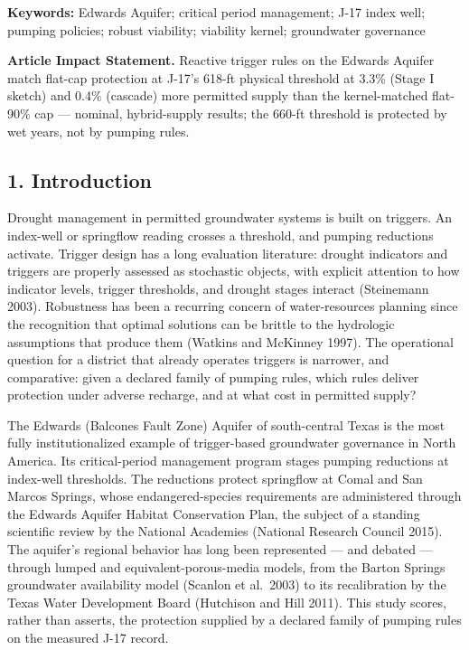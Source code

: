 \documentclass[11pt]{article}
\begin{document}
\textbf{Keywords:} Edwards Aquifer; critical period management; J-17
index well; pumping policies; robust viability; viability kernel;
groundwater governance

\textbf{Article Impact Statement.} Reactive trigger rules on the Edwards
Aquifer match flat-cap protection at J-17's 618-ft physical threshold at
3.3\% (Stage I sketch) and 0.4\% (cascade) more permitted supply than
the kernel-matched flat-90\% cap --- nominal, hybrid-supply results; the
660-ft threshold is protected by wet years, not by pumping rules.

\subsection{1. Introduction}\label{introduction}

Drought management in permitted groundwater systems is built on
triggers. An index-well or springflow reading crosses a threshold, and
pumping reductions activate. Trigger design has a long evaluation
literature: drought indicators and triggers are properly assessed as
stochastic objects, with explicit attention to how indicator levels,
trigger thresholds, and drought stages interact (Steinemann 2003).
Robustness has been a recurring concern of water-resources planning
since the recognition that optimal solutions can be brittle to the
hydrologic assumptions that produce them (Watkins and McKinney 1997).
The operational question for a district that already operates triggers
is narrower, and comparative: given a declared family of pumping rules,
which rules deliver protection under adverse recharge, and at what cost
in permitted supply?

The Edwards (Balcones Fault Zone) Aquifer of south-central Texas is the
most fully institutionalized example of trigger-based groundwater
governance in North America. Its critical-period management program
stages pumping reductions at index-well thresholds. The reductions
protect springflow at Comal and San Marcos Springs, whose
endangered-species requirements are administered through the Edwards
Aquifer Habitat Conservation Plan, the subject of a standing scientific
review by the National Academies (National Research Council 2015). The
aquifer's regional behavior has long been represented --- and debated
--- through lumped and equivalent-porous-media models, from the Barton
Springs groundwater availability model (Scanlon et al.~2003) to its
recalibration by the Texas Water Development Board (Hutchison and Hill
2011). This study scores, rather than asserts, the protection supplied
by a declared family of pumping rules on the measured J-17 record.
\end{document}
